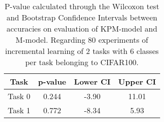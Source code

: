 \begin{table}[H]
\centering
\begin{tabular}{cccc}
\toprule
Task & p-value & Lower CI & Upper CI \\
\midrule
Task 0 & 0.244 &-3.90 & 11.01 \\
Task 1 & 0.772 &-8.34 & 5.93 \\
\bottomrule
\end{tabular}
\caption{P-value calculated through the Wilcoxon test and Bootstrap Confidence Intervals between accuracies on evaluation of KPM-model and M-model. Regarding 80 experiments of incremental learning of 2 tasks with 6 classes per task belonging to CIFAR100.}
\end{table}
